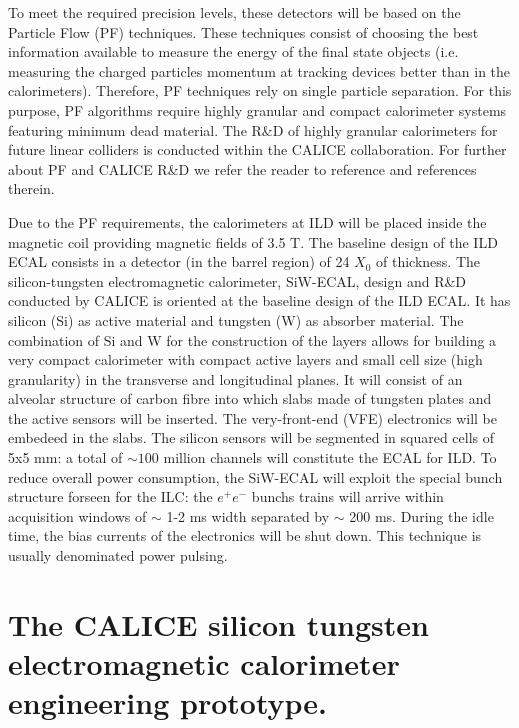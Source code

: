 \documentclass[journal]{IEEEtran}
\begin{document}
To meet the required precision levels, these detectors will be based on the Particle Flow (PF) techniques\cite{Brient:2002gh,Morgunov:2004ed}.
These techniques consist of choosing the best information available
to measure the energy of the final state objects (i.e. measuring the charged particles momentum at tracking devices better than in the calorimeters).
Therefore, PF techniques rely on single particle separation.
For this purpose, PF algorithms require highly granular and compact calorimeter systems featuring minimum dead material.
The R\&D of highly granular calorimeters for future linear colliders is conducted within the CALICE collaboration\cite{calice}.
For further about PF and CALICE R\&D we refer the reader to reference \cite{Sefkow:2015hna} and references therein. 

Due to the PF requirements, the calorimeters at ILD will be placed inside the magnetic coil
providing magnetic fields of 3.5 T. The baseline design of the ILD ECAL consists in a detector (in the barrel region) of 24 $X_{0}$ of thickness.
The silicon-tungsten electromagnetic calorimeter, SiW-ECAL, design and R\&D conducted by CALICE is oriented at the baseline design of the ILD ECAL.
It has silicon (Si) as active material and tungsten (W) as absorber material.
The combination of Si and W for the construction of the layers allows
for building a very compact calorimeter with compact active layers and small cell size (high granularity) in the transverse and longitudinal planes.
It will consist of an alveolar structure of carbon fibre into which slabs made of tungsten
plates and the active sensors will be inserted. The very-front-end (VFE) electronics will be
embedeed in the slabs. The silicon sensors will be segmented
in squared cells of 5x5 mm: a total of $\sim 100$ million channels will constitute the ECAL for ILD.
To reduce overall power consumption, the SiW-ECAL will exploit the special bunch structure
forseen for the ILC: the $e^{+}e^{-}$ bunchs trains will arrive within
acquisition windows of $\sim$ 1-2 ms width separated by $\sim$ 200 ms. During the idle time, the bias currents of the electronics will be shut down.
This technique is usually denominated power pulsing.

\section{The CALICE silicon tungsten electromagnetic calorimeter engineering prototype.}
\end{document}
